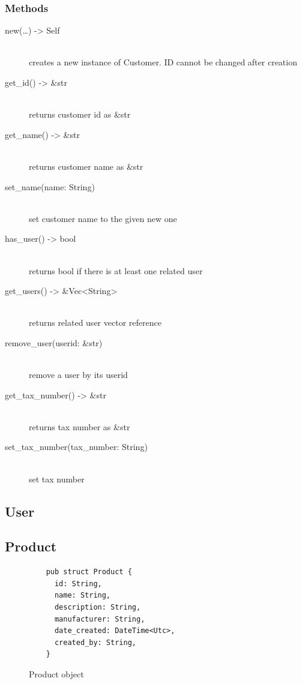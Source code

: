 \documentclass{article}
\begin{document}
\subsubsection{Methods}

\begin{description}
  \item[new(\dots) -> Self] \hfill
    \\ creates a new instance of Customer. ID cannot be changed after
    creation
  \item[get\_id() -> \&str] \hfill
    \\ returns customer id as \&str
  \item[get\_name() -> \&str] \hfill
    \\ returns customer name as \&str
  \item[set\_name(name: String)] \hfill
    \\ set customer name to the given new one
  \item[has\_user() -> bool] \hfill
    \\ returns bool if there is at least one related user
  \item[get\_users() -> \&Vec<String>] \hfill
    \\ returns related user vector reference
  \item[remove\_user(userid: \&str)]  \hfill
    \\ remove a user by its userid
  \item[get\_tax\_number() -> \&str] \hfill
    \\ returns tax number as \&str
  \item[set\_tax\_number(tax\_number: String)] \hfill
    \\ set tax number
  \end{description}

\newpage

\subsection{User}

\subsection{Product}

\begin{figure}[!htb]
  \caption{Product object}
  \begin{verbatim}
    pub struct Product {
      id: String,
      name: String,
      description: String,
      manufacturer: String,
      date_created: DateTime<Utc>,
      created_by: String,
    }
  \end{verbatim}
\end{figure}
\end{document}
